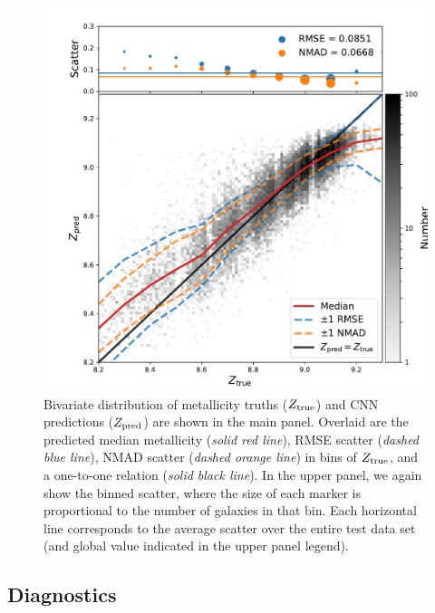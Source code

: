 \documentclass[fleqn,usenatbib]{mnras}
\begin{document}
\begin{figure}
	\includegraphics[width=\columnwidth]{02-prediction_128_summary.pdf}
	\caption{\label{fig:predicting-metallicity}
		Bivariate distribution of metallicity truths ($Z_{\rm true}$) and CNN predictions ($Z_{\rm pred}$) are shown in the main panel.
		Overlaid are the predicted median metallicity (\textit{solid red line}), RMSE scatter (\textit{dashed blue line}), NMAD scatter (\textit{dashed orange line}) in bins of $Z_{\rm true}$, and a one-to-one relation (\textit{solid black line}).
		In the upper panel, we again show the binned scatter, where the size of each marker is proportional to the number of galaxies in that bin.
		Each horizontal line corresponds to the average scatter over the entire test data set (and global value indicated in the upper panel legend).
		}
\end{figure}




\subsection{Diagnostics}\label{sec:diagnostics}

\end{document}
